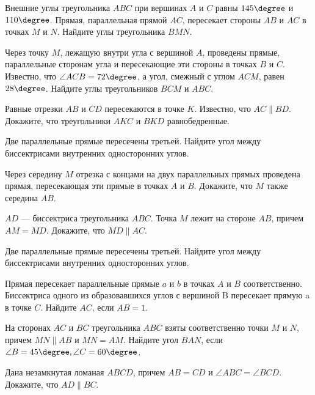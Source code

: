 \begin{homework}[number=1]
	\begin{listofex}
		\item Внешние углы треугольника \(ABC\) при вершинах \(A\) и \(C\) равны \(145\degree\) и \(110\degree \). Прямая, параллельная прямой \(AC\), пересекает стороны \(AB\) и \(AC\) в точках \(M\) и \(N\). Найдите углы треугольника \(BMN\).
		\item Через точку \(M\), лежащую внутри угла с вершиной \(A\), проведены прямые, параллельные сторонам угла и пересекающие эти стороны в точках \(B\) и \(C\). Известно, что \(\angle ACB = 72\degree\), а угол, смежный с углом \(ACM\), равен \(28\degree\). Найдите углы треугольников \(BCM\) и \(ABC\).
		\item Равные отрезки \(AB\) и \(CD\) пересекаются в точке \(K\). Известно, что \(AC \parallel BD \). Докажите, что треугольники \(AKC\) и \(BKD\) равнобедренные.
		\item Две параллельные прямые пересечены третьей. Найдите угол между биссектрисами внутренних односторонних углов.
	\end{listofex}
\end{homework}

\begin{class}[number=3]
	\begin{listofex}
		\item Через середину \(M\) отрезка с концами на двух параллельных прямых проведена прямая, пересекающая эти прямые в точках \(A\) и \(B\). Докажите, что \(M\) также середина \(AB\).
		\item \(AD\) --- биссектриса треугольника \(ABC\). Точка \(M\) лежит на стороне \(AB\), причем \(AM = MD\). Докажите, что \(MD \parallel AC\).
		\item Две параллельные прямые пересечены третьей. Найдите угол между биссектрисами внутренних односторонних углов.
		\item Прямая пересекает параллельные прямые \(a\) и \(b\) в точках \(A\) и \(B\) соответственно. Биссектриса одного из образовавшихся углов с вершиной B пересекает прямую a в точке \(C\). Найдите \(AC\), если \(AB = 1\).
		\item На сторонах \(AC\) и \(BC\) треугольника \(ABC\) взяты соответственно точки \(M\) и \(N\), причем \(MN \parallel AB\) и \(MN = AM\). Найдите угол \(BAN\), если \( \angle B = 45 \degree, \angle C = 60 \degree  \).
		\item Дана незамкнутая ломаная \(ABCD\), причем \(AB = CD\) и \(\angle ABC = \angle BCD \). Докажите, что \(AD \parallel BC\).
	\end{listofex}
\end{class}

